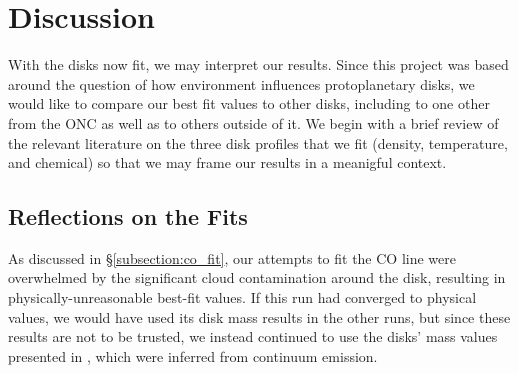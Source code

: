\chapter{Discussion}
\label{chap:discussion}





With the disks now fit, we may interpret our results. Since this project was based around the question of how environment influences protoplanetary disks, we would like to compare our best fit values to other disks, including to one other from the ONC \citep{Factor2017} as well as to others outside of it. We begin with a brief review of the relevant literature on the three disk profiles that we fit (density, temperature, and chemical) so that we may frame our results in a meanigful context.




\section{Reflections on the Fits}

As discussed in \S\ref{subsection:co_fit}, our attempts to fit the CO line were overwhelmed by the significant cloud contamination around the disk, resulting in physically-unreasonable best-fit values. If this run had converged to physical values, we would have used its disk mass results in the other runs, but since these results are not to be trusted, we instead continued to use the disks' mass values presented in \citet{Williams2014}, which were inferred from continuum emission.

